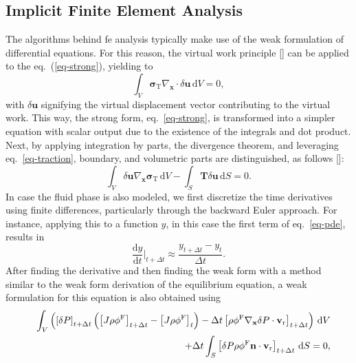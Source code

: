 \subsection{Implicit Finite Element Analysis}
%
The algorithms behind \ac{fe} analysis typically make use of the weak formulation of differential equations. For this reason, the virtual work principle [\cite{antman1979}] can be applied to the eq.~(\ref{eq-strong}), yielding to
%
\begin{equation}\label{eq-weak-alt}
    \int_V \boldsymbol{\sigma}_{\mathrm{T}} \nabla_\mathbf{x} \cdot \delta \mathbf{u} \, \mathrm{d}V = 0,
\end{equation}
%
with $\delta \mathbf{u}$ signifying the virtual displacement vector contributing to the virtual work. This way, the strong form, eq.~\ref{eq-strong}, is transformed into a simpler equation with scalar output due to the existence of the integrals and dot product. Next, by applying integration by parts, the divergence theorem, and leveraging eq.~\ref{eq-traction}, boundary, and volumetric parts are distinguished, as follows [\cite{gerhard-book,belytschko2014}]:
%
\begin{equation}
    \int_V \delta \mathbf{u} \nabla_\mathbf{x} \boldsymbol{\sigma}_{\mathrm{T}} \, \mathrm{d}V - \int_S \mathbf{T} \delta \mathbf{u} \, \mathrm{d}S = 0.
\label{eq-alt-dode}
\end{equation}
%
In case the fluid phase is also modeled, we first discretize the time derivatives using finite differences, particularly through the backward Euler approach. For instance, applying this to a function $y$, in this case the first term of eq.~\ref{eq-pde}, results in
%
\begin{equation}
    \frac{\mathrm{d}y}{\mathrm{d}t} \bigg|_{t+\Delta t} \approx \frac{y_{t+\Delta t} - y_t}{\Delta t}.
\end{equation}
%
After finding the derivative and then finding the weak form with a method similar to the weak form derivation of the equilibrium equation, a weak formulation for this equation is also obtained using
%
\begin{eqnarray}
    & & \int_V \left( \left[ \delta P \right]_{t+\Delta t} \left( \left[ J \rho \phi^{\rm F} \right]_{t+\Delta t} - \left[ J \rho \phi^{\rm F} \right]_{t} \right) - \Delta t \left[ \rho \phi^{\rm F} \nabla_{\mathbf{x}} \delta P \cdot \mathbf{v}_{\rm r} \right]_{t+\Delta t} \right) \, \mathrm{d}V \nonumber \\
    & & + \Delta t \int_S \left[ \delta P \rho \phi^{\rm F} \mathbf{n} \cdot \mathbf{v}_{\rm r} \right]_{t+\Delta t} \, \mathrm{d}S = 0,\label{eq-fluid}
\end{eqnarray}
